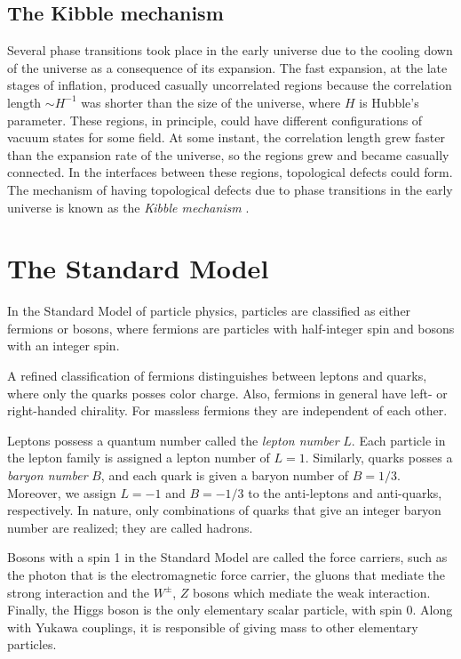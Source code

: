 \subsection{The Kibble mechanism}\label{sec:kibble}

 Several phase transitions took place in the early universe due to the cooling down of the universe as a consequence of its expansion. The fast expansion, at the late stages of inflation, produced casually uncorrelated regions because the correlation length $\sim H^{-1}$ was shorter than the size of the universe, where $H$ is Hubble's parameter. These regions, in principle, could have different configurations of vacuum states for some field. At some instant, the correlation length grew faster than the expansion rate of the universe, so the regions grew and became casually connected. In the interfaces between these regions, topological defects could form. The mechanism of having topological defects due to phase transitions in the early universe is known as the \textit{Kibble mechanism} \cite{Kibble1976,Kibble1980}. 
 


\section{The Standard Model}\label{sec:SM}
In the Standard Model of particle physics, particles are classified as either fermions or bosons, where fermions are particles with half-integer spin and bosons with an integer spin. 

A refined classification of fermions distinguishes between leptons and quarks, where only the quarks posses color charge. Also, fermions in general have left- or right-handed chirality. For massless fermions they are in\-de\-pend\-ent of each other. 

 Leptons possess a quantum number called the \textit{lepton number} $L$. Each particle in the lepton family is assigned a lepton number of $L=1$. Similarly, quarks posses a \textit{baryon number} $B$, and each quark is given a baryon number of $B=1/3$. Moreover, we assign $L=-1$ and $B=-1/3$ to the anti-leptons and anti-quarks, respectively. In nature, only combinations of quarks that give an integer baryon number are realized; they are called hadrons. 

Bosons with a spin 1 in the Standard Model are called the force carriers, such as the photon that is the electromagnetic force carrier, the gluons that mediate the strong interaction and the $W^{\pm}$, $Z$ bosons which mediate the weak interaction. Finally, the Higgs boson is the only elementary scalar particle, with spin 0. Along with Yukawa couplings, it is responsible of giving mass to other elementary particles.

